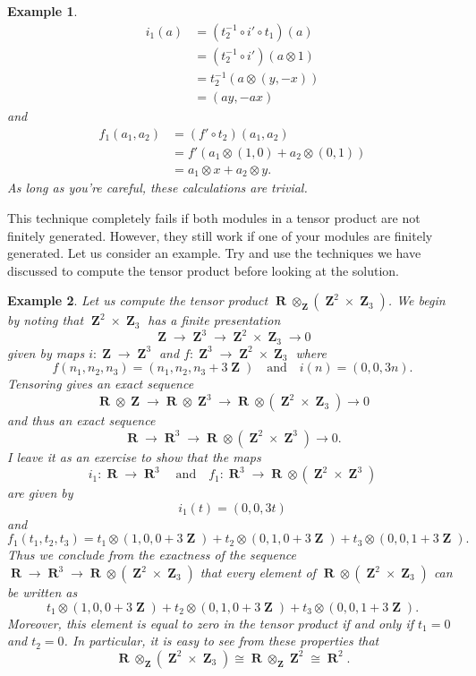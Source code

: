 \documentclass{article}
\theoremstyle{plain}
\newtheorem*{example}{Example}
\theoremstyle{remark}
\theoremstyle{definition}
\DeclareMathOperator{\ZZ}{\mathbf{Z}}
\DeclareMathOperator{\RR}{\mathbf{R}}
\begin{document}
\begin{example}
	\begin{align*}
		i_1(a) &= (t_2^{-1} \circ i' \circ t_1)(a)\\
		&= (t_2^{-1} \circ i')(a \otimes 1)\\
		&= t_2^{-1}(a \otimes (y,-x))\\
		&= (ay,-ax)
	\end{align*}
	and
	\begin{align*}
		f_1(a_1,a_2) &= (f' \circ t_2)(a_1,a_2)\\
		&= f'(a_1 \otimes (1,0) + a_2 \otimes (0,1))\\
		&= a_1 \otimes x + a_2 \otimes y.
	\end{align*}
	As long as you're careful, these calculations are trivial.
\end{example}

This technique completely fails if both modules in a tensor product are not finitely generated. However, they still work if one of your modules are finitely generated. Let us consider an example. Try and use the techniques we have discussed to compute the tensor product before looking at the solution.

\begin{example}
	Let us compute the tensor product $\RR \otimes_{\ZZ} (\ZZ^2 \times \ZZ_3)$. We begin by noting that $\ZZ^2 \times \ZZ_3$ has a finite presentation
	\[ \ZZ \to \ZZ^3 \to \ZZ^2 \times \ZZ_3 \to 0 \]
	given by maps $i: \ZZ \to \ZZ^3$ and $f: \ZZ^3 \to \ZZ^2 \times \ZZ_3$ where
	\[ f(n_1,n_2,n_3) = (n_1,n_2,n_3 + 3 \ZZ) \quad\text{and}\quad i(n) = (0,0,3n). \]
	Tensoring gives an exact sequence
	\[ \RR \otimes \ZZ \to \RR \otimes \ZZ^3 \to \RR \otimes (\ZZ^2 \times \ZZ_3) \to 0 \]
	and thus an exact sequence
	\[ \RR \to \RR^3 \to \RR \otimes (\ZZ^2 \times \ZZ^3) \to 0. \]
	I leave it as an exercise to show that the maps
	\[ i_1: \RR \to \RR^3 \quad\text{and}\quad f_1: \RR^3 \to \RR \otimes (\ZZ^2 \times \ZZ^3) \]
	are given by
	\[ i_1(t) = (0,0,3t) \]
	and
	\[ f_1(t_1,t_2,t_3) = t_1 \otimes (1,0,0 + 3\ZZ) + t_2 \otimes (0,1,0 + 3\ZZ) + t_3 \otimes (0,0,1 + 3 \ZZ). \]
	Thus we conclude from the exactness of the sequence $\RR \to \RR^3 \to \RR \otimes (\ZZ^2 \times \ZZ_3)$ that every element of $\RR \otimes (\ZZ^2 \times \ZZ_3)$ can be written as
	\[ t_1 \otimes (1,0,0 + 3 \ZZ) + t_2 \otimes (0,1,0 + 3 \ZZ) + t_3 \otimes (0,0,1 + 3 \ZZ). \]
	Moreover, this element is equal to zero in the tensor product if and only if $t_1 = 0$ and $t_2 = 0$. In particular, it is easy to see from these properties that
	\[ \RR \otimes_{\ZZ} (\ZZ^2 \times \ZZ_3) \cong \RR \otimes_{\ZZ} \ZZ^2 \cong \RR^2. \]
\end{example}
\end{document}
